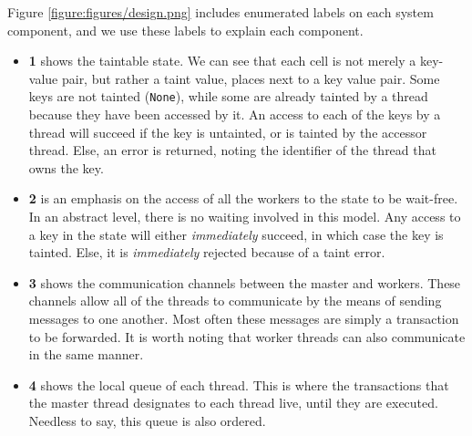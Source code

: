 
Figure \ref{figure:figures/design.png} includes enumerated labels on each system component, and we
use these labels to explain each component.

\begin{itemize}
	\item \textbf{1} shows the taintable state. We can see that each cell is not merely a key-value
	pair, but rather a taint value, places next to a key value pair. Some keys are not tainted
	(\texttt{None}), while some are already tainted by a thread because they have been accessed by
	it. An access to each of the keys by a thread will succeed if the key is untainted, or is
	tainted by the accessor thread. Else, an error is returned, noting the identifier of the thread
	that owns the key.
	\item \textbf{2} is an emphasis on the access of all the workers to the state to be wait-free.
	In an abstract level, there is no waiting involved in this model. Any access to a key in the
	state will either \textit{immediately} succeed, in which case the key is tainted. Else, it is
	\textit{immediately} rejected because of a taint error.
	\item \textbf{3} shows the communication channels between the master and workers. These channels
	allow all of the threads to communicate by the means of sending messages to one another. Most
	often these messages are simply a transaction to be forwarded. It is worth noting that worker
	threads can also communicate in the same manner.
	\item \textbf{4} shows the local queue of each thread. This is where the transactions that the
	master thread designates to each thread live, until they are executed. Needless to say, this
	queue is also ordered.

\end{itemize}






